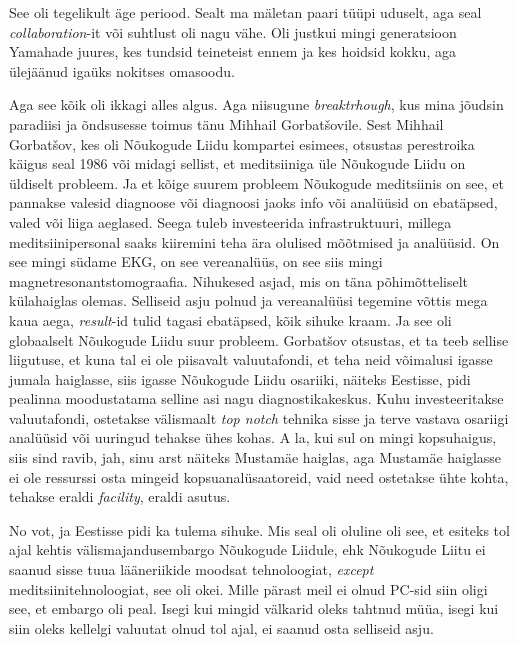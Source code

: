 See oli tegelikult äge periood. Sealt ma mäletan paari tüüpi uduselt, aga seal \emph{collaboration}-it või suhtlust oli nagu vähe. Oli justkui mingi generatsioon Yamahade juures, kes tundsid teineteist ennem ja kes hoidsid kokku, aga ülejäänud  igaüks  nokitses omasoodu. 

Aga see kõik oli ikkagi alles algus. Aga niisugune \emph{breaktrhough}, kus mina jõudsin paradiisi ja õndsusesse  toimus  tänu Mihhail Gorbatšovile. Sest Mihhail Gorbatšov, kes oli Nõukogude Liidu  kompartei esimees, otsustas perestroika käigus seal 1986 või midagi sellist, et meditsiiniga üle Nõukogude Liidu on üldiselt probleem. Ja et kõige suurem probleem Nõukogude meditsiinis on see, et pannakse valesid diagnoose või diagnoosi jaoks info või analüüsid on ebatäpsed, valed või liiga aeglased. Seega tuleb investeerida infrastruktuuri, millega meditsiinipersonal saaks kiiremini teha ära olulised mõõtmised ja analüüsid. On see mingi südame EKG, on see vereanalüüs, on see siis mingi magnetresonantstomograafia. Nihukesed asjad, mis on täna põhimõtteliselt  külahaiglas olemas. Selliseid asju polnud ja vereanalüüsi tegemine võttis mega kaua aega, \emph{result}-id tulid tagasi ebatäpsed, kõik sihuke kraam.  Ja see oli globaalselt Nõukogude Liidu suur probleem. Gorbatšov otsustas, et ta teeb sellise liigutuse, et kuna tal ei ole piisavalt valuutafondi, et teha neid võimalusi igasse jumala haiglasse, siis igasse Nõukogude Liidu osariiki, näiteks Eestisse, pidi pealinna moodustatama selline asi nagu diagnostikakeskus. Kuhu  investeeritakse valuutafondi, ostetakse välismaalt \emph{top notch} tehnika sisse ja terve vastava osariigi analüüsid või uuringud tehakse ühes kohas. A la, kui sul on mingi kopsuhaigus, siis sind ravib, jah, sinu arst näiteks Mustamäe haiglas, aga Mustamäe haiglasse ei ole ressurssi osta mingeid kopsuanalüsaatoreid, vaid need ostetakse ühte kohta,  tehakse eraldi \emph{facility}, eraldi asutus.

No vot, ja Eestisse pidi ka tulema sihuke. Mis seal oli oluline oli see, et esiteks tol ajal kehtis välismajandusembargo Nõukogude Liidule, ehk Nõukogude Liitu ei saanud sisse tuua lääneriikide moodsat tehnoloogiat, \emph{except} meditsiinitehnoloogiat, see oli okei. Mille pärast meil ei olnud PC-sid siin oligi see, et  embargo oli peal. Isegi kui mingid välkarid oleks tahtnud müüa, isegi kui siin oleks kellelgi valuutat  olnud tol ajal, ei saanud osta selliseid asju. 

